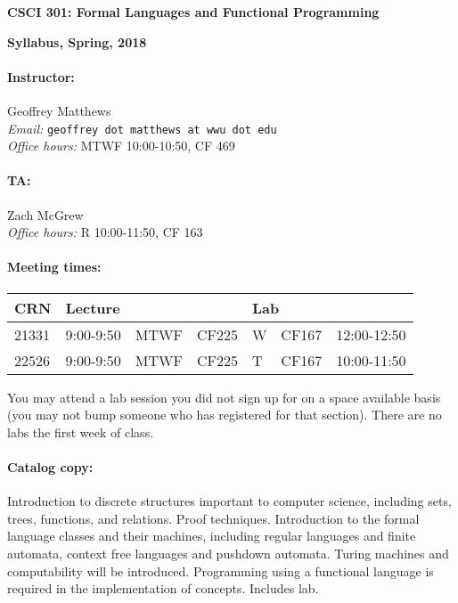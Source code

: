 \documentclass{article}
\begin{document}
\centerline{\Large\bf CSCI 301: Formal Languages and Functional Programming}
\centerline{\large\bf Syllabus, Spring, 2018}

\paragraph{Instructor:} Geoffrey Matthews\\
{\em Email:} {\tt geoffrey dot matthews at wwu dot edu}\\
{\em Office hours:} MTWF 10:00-10:50, CF 469

\paragraph{TA:} Zach McGrew\\
{\em Office hours:} R 10:00-11:50, CF 163

\paragraph{Meeting times:} \mbox{}

  \begin{tabular}{l|lll|lll}
    CRN & \multicolumn{3}{l|}{Lecture}
    & \multicolumn{3}{|l}{Lab}
    \\\hline
    21331 & 9:00-9:50& MTWF & CF225&  W & CF167& 12:00-12:50
    \\
    22526 & 9:00-9:50& MTWF & CF225&  T & CF167&  10:00-11:50 
    \\\hline
    \end{tabular}
	
  You  may attend a
  lab session you did not sign up for on a space available
  basis (you may not bump someone who has registered for
  that section).  There are no labs the first week of class.

\paragraph{Catalog copy:} Introduction to discrete structures important to
  computer science, including sets, trees, functions, and
  relations. Proof techniques. Introduction to the formal language
  classes and their machines, including regular languages and finite
  automata, context free languages and pushdown automata. Turing
  machines and computability will be introduced. Programming using a
  functional language is required in the implementation of
  concepts. Includes lab.
\end{document}
